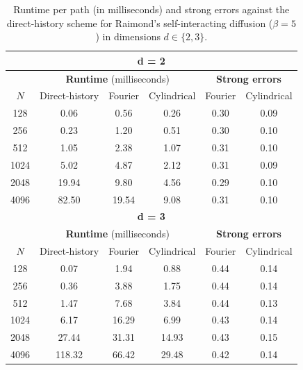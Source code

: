 \documentclass[11pt]{article}
\numberwithin{equation}{section}
\theoremstyle{plain}
\theoremstyle{definition}
\begin{document}
\begin{table}[htbp]
\centering
\caption{Runtime per path (in milliseconds) and strong errors against the direct-history scheme for Raimond's self-interacting diffusion ($\beta = 5$) in dimensions $d \in \{2, 3\}$.}
\label{tab:runtimeCompError}
\begin{tabular}{c|c|c|c|c|c}
\hline
\multicolumn{6}{c}{\textbf{d = 2}} \\
\hline
 & \multicolumn{3}{c|}{\textbf{Runtime} (milliseconds)} & \multicolumn{2}{c}{\textbf{Strong errors}} \\
\hline
\textbf{$N$} & {Direct-history} & {Fourier} & {Cylindrical} & {Fourier} & {Cylindrical} \\
\hline
128  & 0.06 & 0.56  & 0.26  & 0.30 & 0.09  \\     
256  & 0.23  & 1.20 & 0.51   & 0.30  & 0.10 \\      
512  & 1.05  & 2.38  & 1.07  & 0.31 & 0.10  \\     
1024 & 5.02  & 4.87 & 2.12   & 0.31 & 0.09  \\     
2048 & 19.94 & 9.80 & 4.56   & 0.29 & 0.10  \\    
4096 & 82.50 & 19.54 & 9.08  & 0.31 & 0.10  \\ 
\hline
\multicolumn{6}{c}{\textbf{d = 3}} \\
\hline
 & \multicolumn{3}{c|}{\textbf{Runtime} (milliseconds)} & \multicolumn{2}{c}{\textbf{Strong errors}} \\
\hline
\textbf{$N$} & {Direct-history} & {Fourier} & {Cylindrical} & {Fourier} & {Cylindrical} \\
\hline
128    & 0.07         & 1.94     & 0.88              & 0.44       & 0.14         \\     
256    & 0.36            & 3.88    & 1.75             & 0.44     & 0.14         \\      
512    & 1.47              & 7.68  & 3.84               & 0.44   & 0.13         \\      
1024   & 6.17           & 16.29  & 6.99                  & 0.43  & 0.14          \\
2048   & 27.44           & 31.31  & 14.93                 & 0.43  & 0.15          \\   
4096   & 118.32        & 66.42    & 29.48                 & 0.42   & 0.14          \\
\hline
\end{tabular}
\end{table}
\end{document}
